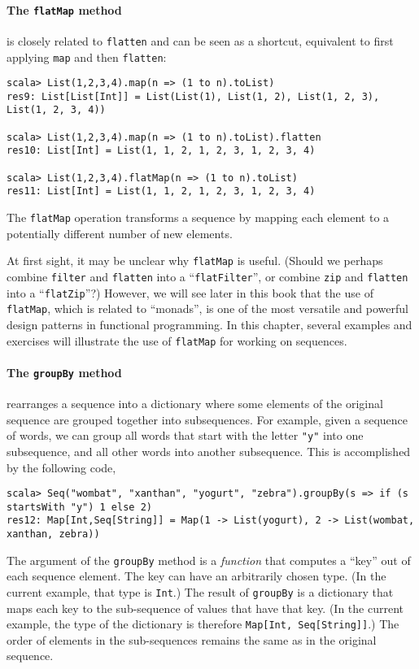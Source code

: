 \paragraph*{The \texttt{flatMap} method}

is closely related to \lstinline!flatten! and can be seen as a shortcut,
equivalent to first applying \lstinline!map! and then \lstinline!flatten!:
\begin{lstlisting}
scala> List(1,2,3,4).map(n => (1 to n).toList)
res9: List[List[Int]] = List(List(1), List(1, 2), List(1, 2, 3), List(1, 2, 3, 4))

scala> List(1,2,3,4).map(n => (1 to n).toList).flatten
res10: List[Int] = List(1, 1, 2, 1, 2, 3, 1, 2, 3, 4)

scala> List(1,2,3,4).flatMap(n => (1 to n).toList)
res11: List[Int] = List(1, 1, 2, 1, 2, 3, 1, 2, 3, 4)
\end{lstlisting}
The \lstinline!flatMap! operation transforms a sequence by mapping
each element to a potentially different number of new elements.

At first sight, it may be unclear why \lstinline!flatMap! is useful.
(Should we perhaps combine \lstinline!filter! and \lstinline!flatten!
into a \textsf{``}\lstinline!flatFilter!\textsf{''}, or combine \lstinline!zip!
and \lstinline!flatten! into a \textsf{``}\lstinline!flatZip!\textsf{''}?) However,
we will see later in this book that the use of \lstinline!flatMap!,
which is related to \textsf{``}monads\textsf{''}, is one of the most
versatile and powerful design patterns in functional programming.
In this chapter, several examples and exercises will illustrate the
use of \lstinline!flatMap! for working on sequences.

\paragraph*{The \texttt{groupBy} method}

rearranges a sequence into a dictionary where some elements of the
original sequence are grouped together into subsequences. For example,
given a sequence of words, we can group all words that start with
the letter \lstinline!"y"! into one subsequence, and all other words
into another subsequence. This is accomplished by the following code,
\begin{lstlisting}
scala> Seq("wombat", "xanthan", "yogurt", "zebra").groupBy(s => if (s startsWith "y") 1 else 2)
res12: Map[Int,Seq[String]] = Map(1 -> List(yogurt), 2 -> List(wombat, xanthan, zebra))
\end{lstlisting}
The argument of the \lstinline!groupBy! method is a \emph{function}
that computes a \textsf{``}key\textsf{''} out of each sequence element. The key can
have an arbitrarily chosen type. (In the current example, that type
is \lstinline!Int!.) The result of \lstinline!groupBy! is a dictionary
that maps each key to the sub-sequence of values that have that key.
(In the current example, the type of the dictionary is therefore \lstinline!Map[Int, Seq[String]]!.)
The order of elements in the sub-sequences remains the same as in
the original sequence.

